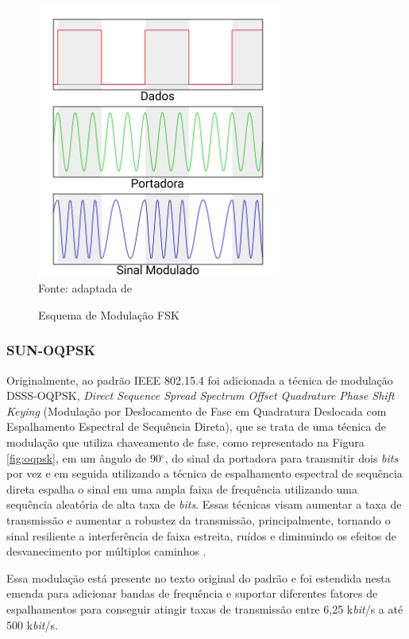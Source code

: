 \begin{figure}[ht!]
	\begin{center}
		\caption{Esquema de Modulação FSK}
		\includegraphics[width=8cm]{./sections/textual/chapters/images/Fsk.png}\\
		Fonte: adaptada de \cite{figFSK}
		\label{fig:fsk}
	\end{center}
\end{figure}


\subsubsection{SUN-OQPSK}
\label{oqpsk}
Originalmente, ao padrão IEEE 802.15.4 foi adicionada a técnica de modulação DSSS-OQPSK, \emph{Direct Sequence Spread Spectrum Offset Quadrature Phase Shift Keying} (Modulação por Deslocamento de Fase em Quadratura Deslocada com Espalhamento Espectral de Sequência Direta), que se trata de uma técnica de modulação que utiliza chaveamento de fase, como representado na Figura \ref{fig:oqpsk}, em um ângulo de 90$^{\circ}$, do sinal da portadora para transmitir dois \emph{bits} por vez e em seguida utilizando a técnica de espalhamento espectral de sequência direta espalha o sinal em uma ampla faixa de frequência utilizando uma sequência aleatória de alta taxa de \emph{bits}. Essas técnicas visam aumentar a taxa de transmissão e aumentar a robustez da transmissão, principalmente, tornando o sinal resiliente a interferência de faixa estreita, ruídos e diminuindo os efeitos de desvanecimento por múltiplos caminhos \cite{goldsmith2005wireless}.

Essa modulação está presente no texto original do padrão e foi estendida nesta emenda para adicionar bandas de frequência e suportar diferentes fatores de espalhamentos para conseguir atingir taxas de transmissão entre 6,25 k\emph{bit}/s a até 500 k\emph{bit}/s.


